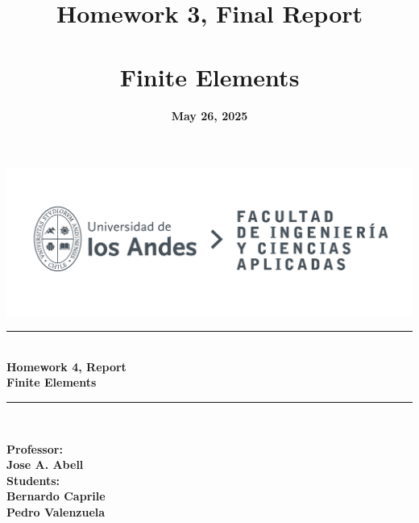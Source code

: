 \documentclass[12pt]{article}
\title{\textbf{Homework 3, Final Report\\ \vspace{0.5cm} \\ Finite Elements}}
\date{\textbf{May 26, 2025}}
\begin{document}
\makeatletter
\begin{titlepage}
    \begin{center}
        \vspace{2cm}
        \includegraphics[width=0.8\linewidth]{LOGO_UNIVERSIDAD.jpg}\\[10ex]
        
        \rule{\textwidth}{1pt} \\[2ex]
        {\LARGE \textbf{Homework 4, Report\\ \vspace{0.5cm} Finite Elements}}\\[2ex]
        \rule{\textwidth}{1pt} \\[10ex]

        \vfill

        \begin{flushright}
            \textbf{Professor:\\
             Jose A. Abell} \\[0.3cm]
            \textbf{Students: \\
            Bernardo Caprile\\
            Pedro Valenzuela} \\[0.3cm]
        \end{flushright}
        
        \vspace*{1cm}
        {\normalsize \@date}
    \end{center}
\end{titlepage}
\makeatother


\pagestyle{fancy}
\fancyhf{}
\rhead{\shorttitle}


\rfoot{\thepage}
\renewcommand{\footrulewidth}{0.5pt}

\tableofcontents
\end{document}
